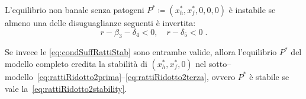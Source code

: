 
\begin{proposizione}
L'equilibrio non banale senza patogeni $P^* \coloneq (x_h^*, x_f^*, 0,0,0)$ è instabile se almeno
una delle disuguaglianze seguenti è invertita:
\begin{equation}
    r - \beta_3 - \delta_4 < 0 , \quad
    r - \delta_5 < 0 \; .
\label{eq:condSuffRattiStab}
\end{equation}

Se invece le \eqref{eq:condSuffRattiStab} sono entrambe valide, allora l'equilibrio $P^*$
del modello completo eredita la stabilità di $(x_h^*, x_f^*, 0)$
nel sotto--modello~\eqref{eq:rattiRidotto2prima}--\eqref{eq:rattiRidotto2terza}, ovvero $P^*$ è stabile se vale la~\eqref{eq:rattiRidotto2stability}.
\end{proposizione}

